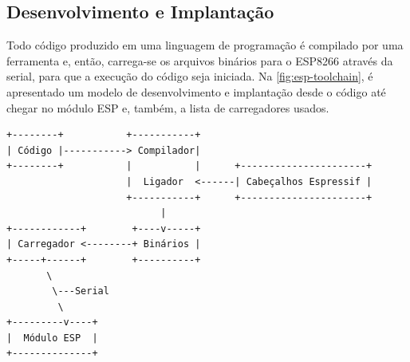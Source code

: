 \subsection{Desenvolvimento e Implantação}
\label{subsec:dev-esp}

Todo código produzido em uma linguagem de programação é compilado por uma
ferramenta e, então, carrega-se os arquivos binários para o ESP8266 através da
serial, para que a execução do código seja iniciada. Na \autoref{fig:esp-toolchain}, é
apresentado um modelo de desenvolvimento e implantação desde o código até chegar
no módulo ESP e, também, a lista de carregadores usados.

\begin{verbatim}
+--------+           +-----------+
| Código |-----------> Compilador|
+--------+           |           |      +----------------------+
                     |  Ligador  <------| Cabeçalhos Espressif |
                     +-----------+      +----------------------+
                           |
+------------+        +----v-----+
| Carregador <--------+ Binários |
+-----+------+        +----------+
       \
        \---Serial
         \
+---------v----+
|  Módulo ESP  |
+--------------+
\end{verbatim}



\begin{table}[htb]
\end{table}

